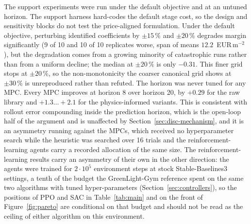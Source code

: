 The support experiments were run under the default objective and at an untuned horizon.
The support harness hard-codes the default stage cost, so the design and sensitivity
blocks do not test the price-aligned formulation. Under the default objective, perturbing
identified coefficients by $\pm15\,\%$ and $\pm20\,\%$ degrades margin significantly (9 of
10 and 10 of 10 replicates worse, span of means $12.2$~EUR\,m$^{-2}$), but the degradation
comes from a growing minority of catastrophic runs rather than from a uniform decline; the
median at $\pm20\,\%$ is only $-0.31$. This finer grid stops at $\pm20\,\%$, so the
non-monotonicity the coarser canonical grid shows at $\pm30\,\%$ is unreproduced rather
than refuted. The horizon was never tuned for any MPC. Every MPC improves at horizon 8
over horizon 20, by $+0.29$ for the raw library and $+1.3\ldots+2.1$ for the
physics-informed variants. This is consistent with rollout error compounding inside the
prediction horizon, which is the open-loop half of the argument and is unaffected by
Section~\ref{sec:disc-mechanism}, and it is an asymmetry running against the MPCs, which
received no hyperparameter search while the heuristic was searched over 16 trials and the
reinforcement-learning agents carry a recorded allocation of the same size. The
reinforcement-learning results carry an asymmetry of their own in the other direction:
the agents were trained for $2\cdot10^{5}$ environment steps at stock Stable-Baselines3
settings, a tenth of the budget the GreenLight-Gym reference spent on the same two
algorithms with tuned hyper-parameters \cite{vanlaatum2025} (Section~\ref{sec:controllers}),
so the positions of PPO and SAC in Table~\ref{tab:main} and on the front of
Figure~\ref{fig:pareto} are conditional on that budget and should not be read as the
ceiling of either algorithm on this environment.

